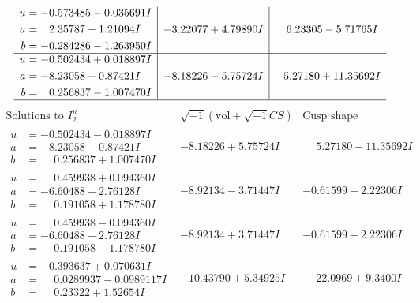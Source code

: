 \documentclass[1p]{elsarticle_modified}
\theoremstyle{definition}
\newcommand{\I}{\sqrt{-1}}
\begin{document}
$$\begin{array}{c|c|c}
\begin{aligned}
u &= -0.573485 - 0.035691 I \\
a &= \phantom{-}2.35787 - 1.21094 I \\
b &= -0.284286 - 1.263950 I\end{aligned}
 & -3.22077 + 4.79890 I & \phantom{-}6.23305 - 5.71765 I \\ \hline\begin{aligned}
u &= -0.502434 + 0.018897 I \\
a &= -8.23058 + 0.87421 I \\
b &= \phantom{-}0.256837 - 1.007470 I\end{aligned}
 & -8.18226 - 5.75724 I & \phantom{-}5.27180 + 11.35692 I\\
 \hline 
 \end{array}$$\newpage$$\begin{array}{c|c|c}  
\text{Solutions to }I^u_{2}& \I (\text{vol} + \sqrt{-1}CS) & \text{Cusp shape}\\
 \hline 
\begin{aligned}
u &= -0.502434 - 0.018897 I \\
a &= -8.23058 - 0.87421 I \\
b &= \phantom{-}0.256837 + 1.007470 I\end{aligned}
 & -8.18226 + 5.75724 I & \phantom{-}5.27180 - 11.35692 I \\ \hline\begin{aligned}
u &= \phantom{-}0.459938 + 0.094360 I \\
a &= -6.60488 + 2.76128 I \\
b &= \phantom{-}0.191058 + 1.178780 I\end{aligned}
 & -8.92134 - 3.71447 I & -0.61599 - 2.22306 I \\ \hline\begin{aligned}
u &= \phantom{-}0.459938 - 0.094360 I \\
a &= -6.60488 - 2.76128 I \\
b &= \phantom{-}0.191058 - 1.178780 I\end{aligned}
 & -8.92134 + 3.71447 I & -0.61599 + 2.22306 I \\ \hline\begin{aligned}
u &= -0.393637 + 0.070631 I \\
a &= \phantom{-}0.0289937 - 0.0989117 I \\
b &= \phantom{-}0.23322 + 1.52654 I\end{aligned}
 & -10.43790 + 5.34925 I & \phantom{-}22.0969 + 9.3400 I \\ \hline\begin{aligned}

\end{aligned}
\end{array}$$
\end{document}

